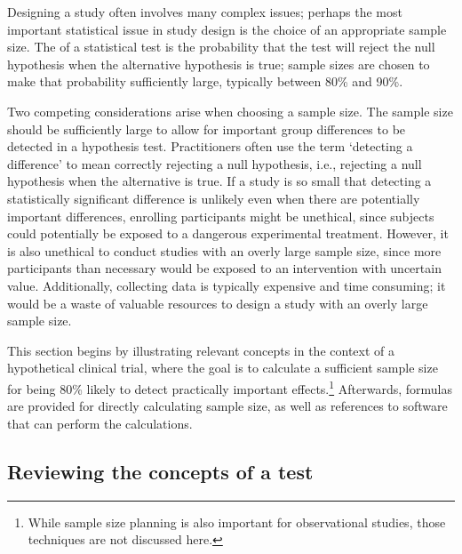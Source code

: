 Designing a study often involves many complex issues; perhaps the most important statistical issue in study design is the choice of an appropriate sample size. The  of a statistical test is the probability that the test will reject the null hypothesis when the alternative hypothesis is true; sample sizes are chosen to make that probability sufficiently large, typically between 80\% and 90\%. 

Two competing considerations arise when choosing a sample size. The sample size should be sufficiently large to allow for important group differences to be detected in a hypothesis test. Practitioners often use the term `detecting a difference' to mean correctly rejecting a null hypothesis, i.e., rejecting a null hypothesis when the alternative is true. If a study is so small that detecting a statistically significant difference is unlikely even when there are potentially important differences, enrolling participants might be unethical, since subjects could potentially be exposed to a dangerous experimental treatment. However, it is also unethical to conduct studies with an overly large sample size, since more participants than necessary would be exposed to an intervention with uncertain value. Additionally, collecting data is typically expensive and time consuming; it would be a waste of valuable resources to design a study with an overly large sample size.

This section begins by illustrating relevant concepts in the context of a hypothetical clinical trial, where the goal is to calculate a sufficient sample size for being 80\% likely to detect practically important effects.\footnote{While sample size planning is also important for observational studies, those techniques are not discussed here.} Afterwards, formulas are provided for directly calculating sample size, as well as references to software that can perform the calculations.


\subsection{Reviewing the concepts of a test}

